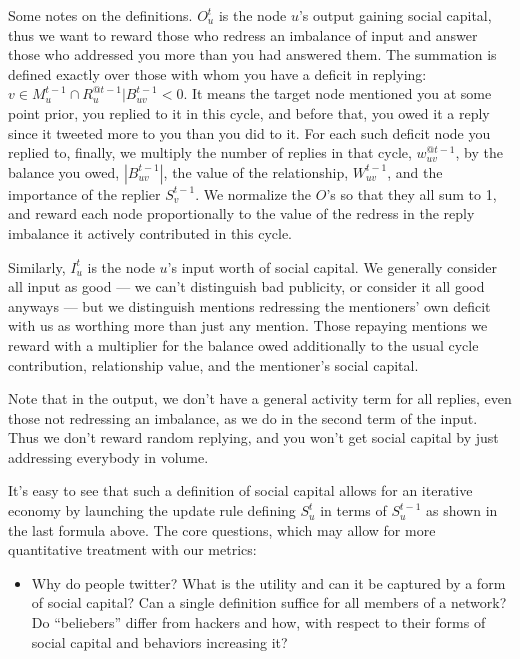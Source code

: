 \documentclass[10pt,oneside]{memoir}
\begin{document}
\begin{Spacing}{2}
Some notes on the definitions. $O_{u}^{t}$ is the node $u$'s output gaining social capital, thus we want to reward those who redress an imbalance of input and answer those who addressed you more than you had answered them. The summation is defined exactly over those with whom you have a deficit in replying: $v\in M_{u}^{t-1}\cap R_{u}^{@t-1}|B_{uv}^{t-1}<0$. It means the target node mentioned you at some point prior, you replied to it in this cycle, and before that, you owed it a reply since it tweeted more to you than you did to it. For each such deficit node you replied to, finally, we multiply the number of replies in that cycle, $w_{uv}^{@t-1}$, by the balance you owed, $|B_{uv}^{t-1}|$, the value of the relationship, $W_{uv}^{t-1}$, and the importance of the replier $S_{v}^{t-1}$. We normalize the $O$'s so that they all sum to 1, and reward each node proportionally to the value of the redress in the reply imbalance it actively contributed in this cycle.

Similarly, $I_{u}^{t}$ is the node $u$'s input worth of social capital. We generally consider all input as good — we can't distinguish bad publicity, or consider it all good anyways — but we distinguish mentions redressing the mentioners' own deficit with us as worthing more than just any mention. Those repaying mentions we reward with a multiplier for the balance owed additionally to the usual cycle contribution, relationship value, and the mentioner's social capital.

Note that in the output, we don't have a general activity term for all replies, even those not redressing an imbalance, as we do in the second term of the input. Thus we don't reward random replying, and you won't get social capital by just addressing everybody in volume.

It's easy to see that such a definition of social capital allows for an iterative economy by launching the update rule defining $S_{u}^{t}$ in terms of $S_{u}^{t-1}$ as shown in the last formula above.
The core questions, which may allow for more quantitative treatment with our metrics:


\begin{itemize}


\item Why do people twitter? What is the utility and can it be captured by a form of social capital? Can a single definition suffice for all members of a network? Do ``beliebers'' differ from hackers and how, with respect to their forms of social capital and behaviors increasing it?





\end{itemize}
\end{Spacing}
\end{document}
